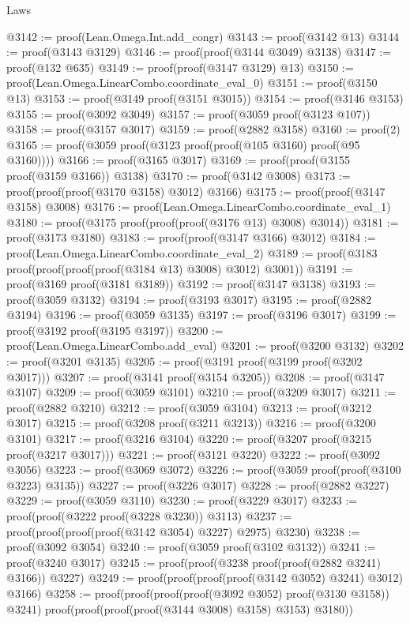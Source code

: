 \begin{lexlean}{Laws}
\begin{coremodule}
@3142 := proof(Lean.Omega.Int.add_congr)
@3143 := proof(@3142 @13)
@3144 := proof(@3143 @3129)
@3146 := proof(proof(@3144 @3049) @3138)
@3147 := proof(@132 @635)
@3149 := proof(proof(@3147 @3129) @13)
@3150 := proof(Lean.Omega.LinearCombo.coordinate_eval_0)
@3151 := proof(@3150 @13)
@3153 := proof(@3149 proof(@3151 @3015))
@3154 := proof(@3146 @3153)
@3155 := proof(@3092 @3049)
@3157 := proof(@3059 proof(@3123 @107))
@3158 := proof(@3157 @3017)
@3159 := proof(@2882 @3158)
@3160 := proof(2)
@3165 := proof(@3059 proof(@3123 proof(proof(@105 @3160) proof(@95 @3160))))
@3166 := proof(@3165 @3017)
@3169 := proof(proof(@3155 proof(@3159 @3166)) @3138)
@3170 := proof(@3142 @3008)
@3173 := proof(proof(proof(@3170 @3158) @3012) @3166)
@3175 := proof(proof(@3147 @3158) @3008)
@3176 := proof(Lean.Omega.LinearCombo.coordinate_eval_1)
@3180 := proof(@3175 proof(proof(proof(@3176 @13) @3008) @3014))
@3181 := proof(@3173 @3180)
@3183 := proof(proof(@3147 @3166) @3012)
@3184 := proof(Lean.Omega.LinearCombo.coordinate_eval_2)
@3189 := proof(@3183 proof(proof(proof(proof(@3184 @13) @3008) @3012) @3001))
@3191 := proof(@3169 proof(@3181 @3189))
@3192 := proof(@3147 @3138)
@3193 := proof(@3059 @3132)
@3194 := proof(@3193 @3017)
@3195 := proof(@2882 @3194)
@3196 := proof(@3059 @3135)
@3197 := proof(@3196 @3017)
@3199 := proof(@3192 proof(@3195 @3197))
@3200 := proof(Lean.Omega.LinearCombo.add_eval)
@3201 := proof(@3200 @3132)
@3202 := proof(@3201 @3135)
@3205 := proof(@3191 proof(@3199 proof(@3202 @3017)))
@3207 := proof(@3141 proof(@3154 @3205))
@3208 := proof(@3147 @3107)
@3209 := proof(@3059 @3101)
@3210 := proof(@3209 @3017)
@3211 := proof(@2882 @3210)
@3212 := proof(@3059 @3104)
@3213 := proof(@3212 @3017)
@3215 := proof(@3208 proof(@3211 @3213))
@3216 := proof(@3200 @3101)
@3217 := proof(@3216 @3104)
@3220 := proof(@3207 proof(@3215 proof(@3217 @3017)))
@3221 := proof(@3121 @3220)
@3222 := proof(@3092 @3056)
@3223 := proof(@3069 @3072)
@3226 := proof(@3059 proof(proof(@3100 @3223) @3135))
@3227 := proof(@3226 @3017)
@3228 := proof(@2882 @3227)
@3229 := proof(@3059 @3110)
@3230 := proof(@3229 @3017)
@3233 := proof(proof(@3222 proof(@3228 @3230)) @3113)
@3237 := proof(proof(proof(proof(@3142 @3054) @3227) @2975) @3230)
@3238 := proof(@3092 @3054)
@3240 := proof(@3059 proof(@3102 @3132))
@3241 := proof(@3240 @3017)
@3245 := proof(proof(@3238 proof(proof(@2882 @3241) @3166)) @3227)
@3249 := proof(proof(proof(proof(@3142 @3052) @3241) @3012) @3166)
@3258 := proof(proof(proof(proof(@3092 @3052) proof(@3130 @3158)) @3241)
      proof(proof(proof(proof(@3144 @3008) @3158) @3153) @3180))

\end{coremodule}
\end{lexlean}
